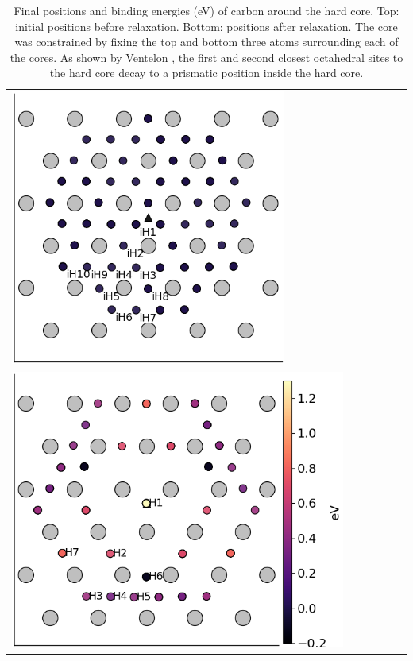 \documentclass[a4paper,11pt]{article}
\begin{document}
\begin{table}	
    \begin{tabular}{l}
 	          \includegraphics[width=0.7\textwidth]{../Images/hard_core_fe_C_initial_positioning.png}  \\
 	          \includegraphics[width=0.85\textwidth]{../Images/hard_core_fe_C_positioning_energies_h7_label.png}  \\

     	     \end{tabular}		
\caption{ Final positions and binding energies (eV) of carbon around the hard core. Top: initial positions before relaxation. Bottom: positions after relaxation. The core was constrained by fixing the top and bottom three atoms surrounding each of the cores. As shown by Ventelon \cite{Ventelon2015}, the first and second closest octahedral sites to the hard core decay to a prismatic position inside the hard core. }
\label{hardbindingenergydist}
   \end{table}
\end{document}
